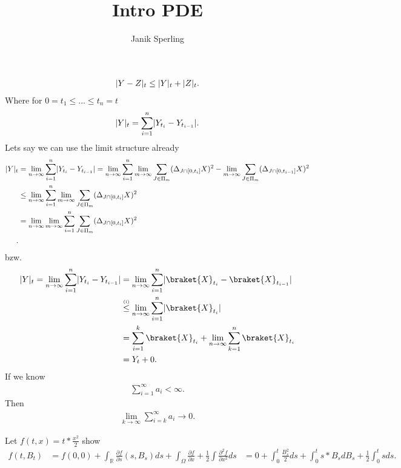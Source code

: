 \documentclass[a4paper]{report}
\title{Intro PDE}
\author{Janik Sperling}
\begin{document}
% 
% 
% 
% 
% 
% 
\begin{align*}
  \lvert Y-Z\rvert_t \le  \lvert Y\rvert_t + \lvert Z\rvert_t
.\end{align*}
Where  for $0 = t_{1}\le \ldots \le t_{n} = t$
\begin{align*}
  \lvert Y\rvert_t = \sum_{i=1}^{n}  \lvert Y_{t_i} - Y_{t_{i-1}}\rvert
.\end{align*}
Lets say we can use the limit structure already
\begin{align*} 
  \abs{Y}_t &= \lim_{n \to \infty}\sum_{i=1}^{n}  \abs{Y_{t_i} - Y_{t_{i-1}}} = \lim_{n \to \infty} \sum_{i=1}^{n} \lim_{m\to \infty} \sum_{J \in  \Pi_m} (\Delta_{J \cap [0,t_i]} X)^2 -  \lim_{m\to \infty} \sum_{J \in  \Pi_m} (\Delta_{J \cap [0,t_{i-1}]} X)^2\\
            &\le  \lim_{n \to \infty} \sum_{i=1}^{n} \lim_{m\to \infty} \sum_{J \in  \Pi_m} (\Delta_{J \cap [0,t_i]} X)^2 \\
            &=  \lim_{n \to \infty} \lim_{m\to \infty}\sum_{i=1}^{n}  \sum_{J \in  \Pi_m} (\Delta_{J \cap [0,t_i]} X)^2 \\
.\end{align*}
bzw. 
\begin{align*}
  \abs{Y}_t  = \lim_{n\to \infty} \sum_{i=1}^{n} \abs{Y_{t_i}-Y_{t_{i-1}}}  &=  \lim_{n\to \infty} \sum_{i=1}^{n} \abs{\braket{X}_{t_i} - \braket{X}_{t_{i-1}}}\\
                                                                            &\myS{(i)}{\le } \lim_{n\to \infty} \sum_{i=1}^{n} \abs{\braket{X}_{t_i}}\\ 
                                                                            &= \sum_{i=1}^{k} \braket{X}_{t_i} + \lim_{n \to \infty}  \sum_{k=1}^{n} \braket{X}_{t_i} \\
                                                                            &= Y_t + 0
.\end{align*}
If we know 
\begin{align*}
  \sum_{i=1}^{\infty} a_i < \infty 
.\end{align*}
Then 
\begin{align*}
  \lim_{k\to \infty} \sum_{i=k}^{\infty} a_i \to 0 
.\end{align*}
\begin{exercise}
 Let $f(t,x) = t*\frac{x^2}{2}$  show 
 \begin{align*}
   f(t,B_t) &= f(0,0) + \int_{\mathbb{R}} \frac{\partial f}{\partial s}(s,B_s) ds + \int_{\Omega } \frac{\partial f}{\partial x} + \frac{1}{2} \int \frac{\partial ^2f}{\partial x^2}   ds
            &= 0 + \int_0^{t} \frac{B_s^2}{2} ds + \int_0^{t} s*B_s dB_s + \frac{1}{2}  \int_0^{t} s ds 
 .\end{align*}
\end{exercise}
\end{document}
